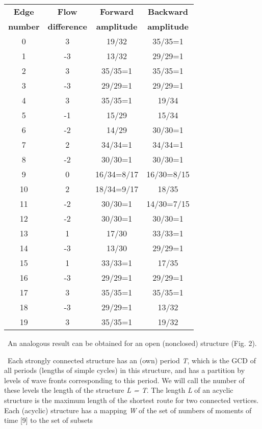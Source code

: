 \documentclass[10pt, a4paper]{article}
\begin{document}
\begin{multicols}{2}
\begin{center}
{\begin{tabular}{ |c|c|c|c|}
\hline
\textbf {Edge} & \textbf{Flow} & \textbf {Forward} & \textbf{Backward} \\ \textbf {number} & \textbf{difference} & \textbf {amplitude } & \textbf{amplitude} \\ 
\hline
0 & 3 & 19/32 & 35/35=1  \\
\hline
1 & -3 & 13/32 & 29/29=1 \\ 
     \hline
2 & 3 & 35/35=1 & 35/35=1 \\
 \hline
 3 & -3 & 29/29=1 & 29/29=1\\
 \hline
4 & 3 & 35/35=1 & 19/34\\
\hline
5 & -1 & 15/29 & 15/34\\
\hline
6 & -2 & 14/29 & 30/30=1\\
\hline
7 & 2 & 34/34=1 & 34/34=1 \\
\hline
8 & -2 & 30/30=1 & 30/30=1 \\
\hline
9 & 0 & 16/34=8/17 & 16/30=8/15\\
\hline
10 & 2 & 18/34=9/17 & 18/35\\
\hline
11 & -2 & 30/30=1 & 14/30=7/15\\
\hline
12 & -2 & 30/30=1 & 30/30=1\\
\hline
13 & 1 & 17/30 & 33/33=1\\
\hline
14 & -3 & 13/30 & 29/29=1 \\
\hline
15 & 1 & 33/33=1 & 17/35\\
\hline
16 & -3 & 29/29=1 & 29/29=1\\
\hline
17 & 3 & 35/35=1 & 35/35=1\\
\hline
18 & -3 & 29/29=1 & 13/32\\
\hline
19 & 3 & 35/35=1 & 19/32 \\
\hline
 \end{tabular} }
 \end{center}
\par \ An analogous result can be obtained for an open (nonclosed) structure (Fig. 2).
\par \ Each strongly connected structure has an (own) period \textit T, which is the GCD of all periods (lengths of simple 
cycles) in this structure, and has a partition by levels of
wave fronts corresponding to this period. We will call the
number of these levels the length of the structure \textit {L = T}.
The length \textit L of an acyclic structure is the maximum
length of the shortest route for two connected vertices.
Each (acyclic) structure has a mapping \textit W of the set of
numbers of moments of time [9] to the set of subsets

\end{multicols}
\end{document}
